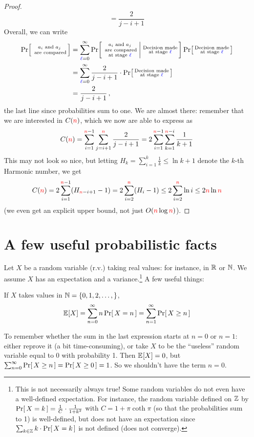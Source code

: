 \begin{proof}
\[        = \frac{2}{j-i+1}
    \]
    Overall, we can write
    \begin{align*}
        \probaOf{\substack{a_i\text{ and } a_j\\\text{ are compared}}}
        &= \sum_{{\blue{\ell}}=0}^\infty \probaCond{\substack{a_i\text{ and } a_j\\\text{ are compared}\\\text{at stage }{\blue{\ell}}} }{\substack{\text{Decision made}\\\text{at stage }{\blue{\ell}}}}
        \probaOf{\substack{\text{Decision made}\\\text{at stage }{\blue{\ell}}}}\\
        &= \sum_{{\blue{\ell}}=0}^\infty \frac{2}{j-i+1}\cdot \probaOf{\substack{\text{Decision made}\\\text{at stage }{\blue{\ell}}}} \\
        &= \frac{2}{j-i+1}\,,
    \end{align*}
    the last line since probabilities sum to one. 
    We are almost there: remember that we are interested in $C({\textcolor{red}{n}})$, which we now are able to express as
    \[
    C({\textcolor{red}{n}}) = \sum_{i=1}^{{\textcolor{red}{n}}-1} \sum_{j=i+1}^{\textcolor{red}{n}} \frac{2}{j-i+1}
    = 2\sum_{i=1}^{{\textcolor{red}{n}}-1} \sum_{k=1}^{{\textcolor{red}{n}}-i} \frac{1}{k+1}
    \]
    This may not look so nice, but letting $H_k = \sum_{i=1}^k \frac{1}{k} \leq \ln k + 1$ denote the $k$-th Harmonic number, we get
    \[
    C({\textcolor{red}{n}}) = 2\sum_{i=1}^{{\textcolor{red}{n}}-1}( H_{{\textcolor{red}{n}}-i+1} - 1 )
    = 2\sum_{i=2}^{{\textcolor{red}{n}}} ( H_i - 1 )
    \leq 2\sum_{i=2}^{{\textcolor{red}{n}}} \ln i \leq 2{\textcolor{red}{n}}\ln {\textcolor{red}{n}}
    \]
    (we even get an explicit upper bound, not just $O({\textcolor{red}{n}}\log{\textcolor{red}{n}})$).
\end{proof}


\section{A few useful probabilistic facts}
Let $X$ be a random variable (r.v.) taking real values: for instance, in $\mathbb{R}$ or $\mathbb{N}$. We assume $X$ has an expectation and a variance.\footnote{This is not necessarily always true! Some random variables do not even have a well-defined expectation. For instance, the random variable defined on $\mathbb{Z}$ by $\probaOf{X=k} = \frac{1}{C}\cdot \frac{1}{1+k^2}$ with $C = 1+\pi\coth \pi$ (so that the probabilities sum to 1) is well-defined, but does not have an expectation since $\sum_{k\in\Z}k\cdot \probaOf{X=k}$ is not defined (does not converge).} A few useful things:
\begin{fact}
If $X$ takes values in $\mathbb{N} = \{0,1,2,\dots,\}$,
\[
\bEE{X} = \sum_{n=0}^\infty n\probaOf{X=n} = \sum_{n=1}^\infty\probaOf{X \geq n}
\]
\end{fact}
To remember whether the sum in the last expression starts at $n=0$ or $n=1$: either reprove it (a bit time-consuming), or take $X$ to be the ``useless'' random variable equal to 0 with probability 1. Then $\bEE{X}=0$, but $\sum_{n=0}^\infty\probaOf{X \geq n} = \probaOf{X \geq 0} = 1$. So we shouldn't have the term $n=0$.

